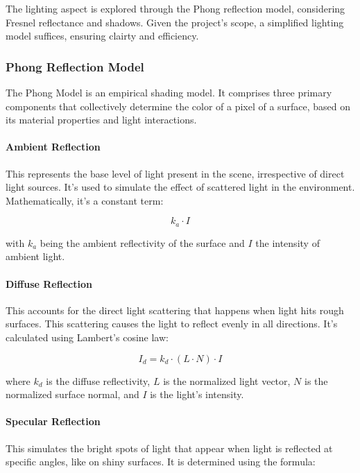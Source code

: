 The lighting aspect is explored through the Phong reflection model, considering Fresnel reflectance and shadows. Given the project's scope, a simplified lighting model suffices, ensuring clairty and efficiency.

\subsubsection{Phong Reflection Model}
\label{Phong}

The Phong Model is an empirical shading model. It comprises three primary components that collectively determine the color of a pixel of a surface,  based on its material properties and light interactions.

\paragraph{Ambient Reflection} This represents the base level of light present in the scene, irrespective of direct light sources. It's used to simulate the effect of scattered light in the environment. Mathematically, it's a constant term:

\begin{equation}
\label{ambient}
k_a \cdot I
\end{equation}

with $k_a$ being the ambient reflectivity of the surface and $I$ the intensity of ambient light.

\paragraph{Diffuse Reflection} This accounts for the direct light scattering that happens when light hits rough surfaces. This scattering causes the light to reflect evenly in all directions. It's calculated using Lambert’s cosine law: 
    
\begin{equation}
\label{diffuse}
I_d = k_d \cdot (L \cdot N) \cdot I
\end{equation}

where $k_d$ is the diffuse reflectivity, $L$ is the normalized light vector, $N$ is the normalized surface normal, and $I$ is the light's intensity.
    
\paragraph{Specular Reflection} This simulates the bright spots of light that appear when light is reflected at specific angles, like on shiny surfaces. It is determined using the formula: 

